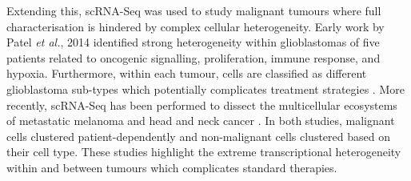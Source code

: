 Extending this, scRNA-Seq was used to study malignant tumours where full characterisation is hindered by complex cellular heterogeneity. 
Early work by Patel \emph{et al.}, 2014 identified strong heterogeneity within glioblastomas of five patients related to oncogenic signalling, proliferation, immune response, and hypoxia. 
Furthermore, within each tumour, cells are classified as different glioblastoma sub-types which potentially complicates treatment strategies \citep{Patel2014}. 
More recently, scRNA-Seq has been performed to dissect the multicellular ecosystems of metastatic melanoma \citep{Tirosh2016} and head and neck cancer \citep{Puram2017}. 
In both studies, malignant cells clustered patient-dependently and non-malignant cells clustered based on their cell type. 
These studies highlight the extreme transcriptional heterogeneity within and between tumours which complicates standard therapies. \\

